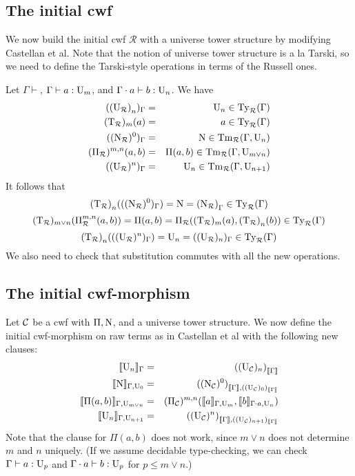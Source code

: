 \documentclass{lmcs}
\newcommand{\Ta}{\mathrm{T}}
\newcommand{\Ru}{\mathcal{R}}
\newcommand{\Un}{\U_n}
\newcommand{\TRu}{\Ta_\Ru}
\newcommand{\URu}{\U_\Ru}
\newcommand{\NRu}{\N_\Ru}
\newcommand{\PiRu}{\Pi_\Ru}
\newcommand{\TRun}{{(\Ta_\Ru)}_n}
\newcommand{\URun}{{(\U_\Ru)}_n}
\newcommand{\UC}{\U_\C}
\newcommand{\NC}{\N_\C}
\newcommand{\PiC}{\Pi_\C}
\begin{document}
\subsection{The initial cwf}

We now build the initial cwf $\Ru$ with a universe tower structure by modifying Castellan et al. Note that the notion of universe tower structure is a la Tarski, so we need to define the Tarski-style operations in terms of the Russell ones.

Let $\Gamma \vdash$, $\Gamma \vdash a : \mathrm{U}_m$, and $\Gamma \cdot a \vdash b : \Un$. We have
\begin{eqnarray*}
({\URun})_\Gamma &=& \Un  \in \Ty_\Ru(\Gamma)\\
(\TRu)_m(a) &=& a \in \Ty_\Ru(\Gamma)\\
({(\NRu)^0})_\Gamma &=& \N \in \Tm_\Ru(\Gamma,\Un)\\
(\PiRu)^{m,n}(a,b) &=& \Pi(a,b) \in \Tm_\Ru(\Gamma,\U_{m \vee n})\\
(({\URu})^n)_\Gamma &=& \Un  \in \Tm_\Ru(\Gamma,\U_{n+1})
\end{eqnarray*}
It follows that 
$$
\TRun(((\NRu)^0)_\Gamma)  =  \N = {(\NRu)}_\Gamma \in \Ty_\Ru(\Gamma)
$$
$$
(\TRu)_{m \vee n}(\PiRu^{m,n}(a,b)) = \Pi(a,b) = \PiRu((\TRu)_m(a),\TRun(b))\in \Ty_\Ru(\Gamma)
$$
$$
\TRun(((\URu)^n)_\Gamma)  =  \Un = ({(\URu)_n})_\Gamma \in \Ty_\Ru(\Gamma)
$$
We also need to check that substitution commutes with all the new operations.

\subsection{The initial cwf-morphism}

Let ${\mathcal C}$ be a cwf with $\Pi, \mathrm{N}$, and a universe tower structure. We now define the initial cwf-morphism on raw terms as in Castellan et al with the following new clauses:
\begin{eqnarray*}
\inte{\Un}_\Gamma &=& {({({\UC})_n})}_{\inte{\Gamma}}\\
\inte{\N}_{\Gamma,\U_0} &=&  {({({\NC})^0})}_{\inte{\Gamma},((\UC)_0)_{\inte{\Gamma}}}\\
\inte{\Pi(a,b)}_{\Gamma,\U_{m \vee n}}&=& {{({\PiC})^{m,n}}}(\inte{a}_{\Gamma,\U_m},\inte{b}_{\Gamma \cdot a,\Un})\\
\inte{\U_n}_{\Gamma,\U_{n+1}} &=& {({({\UC})^n})}_{\inte{\Gamma},((\UC)_{n+1})_{\inte{\Gamma}}}
\end{eqnarray*}
Note that the clause for $\Pi(a,b)$ does not work, since $m \vee n$ does not determine $m$ and $n$ uniquely. (If we assume decidable type-checking, we can check $\Gamma \vdash a : \mathrm{U}_p$ and $\Gamma \cdot a \vdash b : \mathrm{U}_p$ for $p \leq m \vee n$.)
\end{document}
